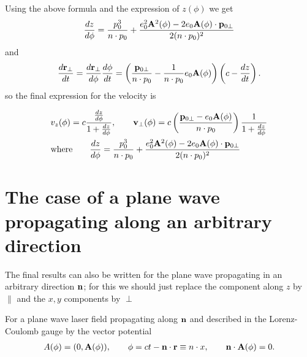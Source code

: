 Using the above formula and the expression of $z(\phi)$ we get
\begin{equation}
    \frac{dz}{d\phi} = \frac{p_0^3}{n\cdot p_0}+\frac{e_0^2{\bf A}^2(\phi)-2e_0{\bf A}(\phi)\cdot{\bf p}_{0\perp}}{2(n\cdot p_0)^2}
\end{equation}
and
\begin{align}
    \frac{d{\bf r}_{\perp}}{dt} = \frac{d{\bf r}_{\perp}}{d\phi}\frac{d\phi}{dt} = \left(\frac{{\bf p}_{0\perp}}{n\cdot p_0}-\frac{1}{n\cdot p_0}e_0{\bf A}(\phi)\right)\left(c-\frac{dz}{dt}\right).
\end{align}
so the final expression for the velocity is
\begin{importantbox}
    \begin{align}
         & v_z(\phi) = c\frac{\frac{dz}{d\phi}}{1+\frac{dz}{d\phi}},\qquad
        {\bf v}_{\perp}(\phi) = c\left(\frac{{\bf p}_{0\perp}-e_0{\bf A}(\phi)}{n\cdot p_0}\right)\frac1{1+\frac{dz}{d\phi}}                                \\
         & \text{where}\qquad \frac{dz}{d\phi}=\frac{p_0^3}{n\cdot p_0}+\frac{e_0^2{\bf A}^2(\phi)-2e_0{\bf A}(\phi)\cdot{\bf p}_{0\perp}}{2(n\cdot p_0)^2}
    \end{align}
\end{importantbox}


\section{The case of a plane wave propagating along an arbitrary direction}

{\color{red}The final results can also be written for the plane wave propagating in an arbitrary direction ${\bf n}$; for this we should just replace the component along $z$ by $\parallel$ and the $x,y$ components by $\perp$}
\begin{highlightbox}
For a plane wave laser field propagating along ${\bf n}$ and described in the Lorenz-Coulomb gauge by the vector potential
\begin{align}
A(\phi) = (0, {\bf A}(\phi)),\qquad \phi = ct -{\bf n}\cdot{\bf r}\equiv n\cdot x,
\qquad {\bf n}\cdot{\bf A}(\phi)=0.
\end{align}
\end{highlightbox}

